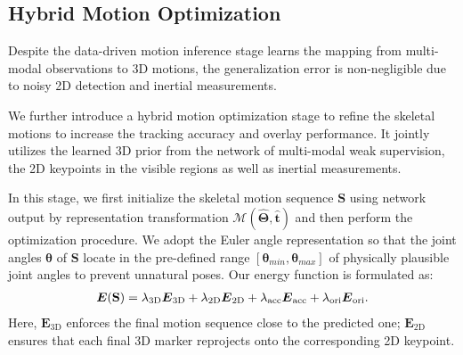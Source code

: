 \documentclass[letterpaper]{article} \usepackage{aaai23}  \usepackage{times}  \usepackage{helvet}  \usepackage{courier}  \usepackage[hyphens]{url}  \usepackage{graphicx} \urlstyle{rm} \def\UrlFont{\rm}  \usepackage{natbib}  \usepackage{caption} \frenchspacing  \setlength{\pdfpagewidth}{8.5in}  \setlength{\pdfpageheight}{11in}  \usepackage{algorithm}
\begin{document}
\subsection{Hybrid Motion Optimization}
\label{sec:mot_optimization}



Despite the data-driven motion inference stage learns the mapping from multi-modal observations to 3D motions, the generalization error is non-negligible due to noisy 2D detection and inertial measurements. 

We further introduce a hybrid motion optimization stage to refine the skeletal motions to increase the tracking accuracy and overlay performance.
It jointly utilizes the learned 3D prior from the network of multi-modal weak supervision, the 2D keypoints in the visible regions as well as inertial measurements. 

In this stage, we first initialize the skeletal motion sequence $\textbf{S}$ using network output by representation transformation $\mathcal{M}(\mathbf{\hat{\Theta}},\mathbf{\hat{t}})$ and then perform the optimization procedure. 
We adopt the Euler angle representation so that the joint angles $\boldsymbol{\theta}$ of $\textbf{S}$ locate in the pre-defined range $[\boldsymbol{\theta}_{min},  \boldsymbol{\theta}_{max}]$ of physically plausible joint angles to prevent unnatural poses.
Our energy function is formulated as:
\begin{align} \label{eq:opt}
	\vspace{-0.2mm}
	\boldsymbol{E}(\mathbf{S}) = \lambda_{\mathrm{3D}}\boldsymbol{E}_{\mathrm{3D}} + \lambda_{\mathrm{2D}}\boldsymbol{E}_{\mathrm{2D}} +
\lambda_{\mathrm{acc}}\boldsymbol{E}_{\mathrm{acc}} + \lambda_{\mathrm{ori}}\boldsymbol{E}_{\mathrm{ori}}.
	\vspace{-0.2mm}
\end{align}
Here, $\boldsymbol{E}_{\mathrm{3D}}$ enforces the final motion sequence close to the predicted one; $\boldsymbol{E}_{\mathrm{2D}}$ ensures that each final 3D marker reprojects onto the corresponding 2D keypoint. 
\end{document}
